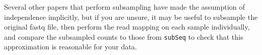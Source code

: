 \documentclass{article}\usepackage[]{graphicx}\usepackage[]{color}
\begin{document}
Several other papers that perform subsampling have made the assumption of independence implicitly, but if you are unsure, it may be useful to subsample the original fastq file, then perform the read mapping on each sample individually, and compare the subsampled counts to those from \texttt{subSeq} to check that this approximation is reasonable for your data.



\end{document}
